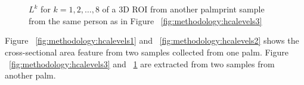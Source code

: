 \begin{figure}[htb]
{}\\
\hspace{0.15\linewidth}
\\
\hspace{0.15\linewidth}
\caption[Different cross-section area $L^k$ for $k=1,2,\dots,8$]{$L^k$ for $k=1,2,\dots,8$ of a 3D ROI from another palmprint sample from the same person as in Figure ~\ref{fig:methodology:hcalevels3}}
\label{fig:methodology:hcalevels4}
\end{figure}

Figure ~\ref{fig:methodology:hcalevels1} and ~\ref{fig:methodology:hcalevels2} shows the cross-sectional area feature from two samples collected from one palm. Figure ~\ref{fig:methodology:hcalevels3} and ~\ref{fig:methodology:hcalevels4} are extracted from two samples from another palm.
